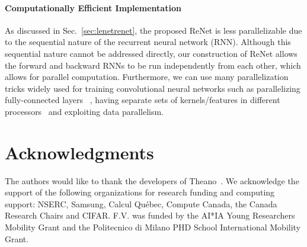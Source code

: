 \paragraph{Computationally Efficient Implementation}
As discussed in Sec.~\ref{sec:lenetrenet}, the proposed ReNet is less
parallelizable due to the sequential nature of the recurrent neural network
(RNN). Although this sequential nature cannot be addressed directly, our
construction of ReNet allows the forward and backward RNNs to be run
independently from each other, which allows for parallel computation.
Furthermore, we can use many parallelization tricks widely used for training
convolutional neural networks such as parallelizing fully-connected layers
~\citep{krizhevsky2014one}, having separate sets of kernels/features in
different processors~\citep{Krizhevsky-2012} and exploiting data parallelism.

\section*{Acknowledgments}

The authors would like to thank the developers of
Theano~\citep{Bergstra2010,Bastien2012}. We acknowledge the support of the
following organizations for research funding and computing support: NSERC,
Samsung, Calcul Qu\'{e}bec, Compute Canada, the Canada Research Chairs and
CIFAR.  F.V. was funded by the AI*IA Young Researchers Mobility Grant
and the Politecnico di Milano PHD School International Mobility Grant.


